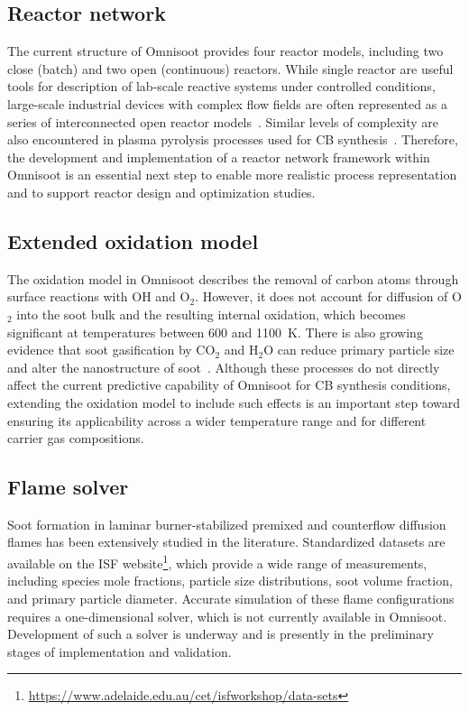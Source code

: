 \subsection{Reactor network}
The current structure of Omnisoot provides four reactor models, including two close (batch) and two open (continuous) reactors. While single reactor are useful tools for description of lab-scale reactive systems under controlled conditions, large-scale industrial devices with complex flow fields are often represented as a series of interconnected open reactor models~\citep{savarese2024model}. Similar levels of complexity are also encountered in plasma pyrolysis processes used for CB synthesis~\citep{lawson2025assessing}. Therefore, the development and implementation of a reactor network framework within Omnisoot is an essential next step to enable more realistic process representation and to support reactor design and optimization studies.

\subsection{Extended oxidation model}

The oxidation model in Omnisoot describes the removal of carbon atoms through surface reactions with OH and O$_2$. However, it does not account for diffusion of O$_2$ into the soot bulk and the resulting internal oxidation, which becomes significant at temperatures between 600 and 1100~K. There is also growing evidence that soot gasification by CO$_2$ and H$_2$O can reduce primary particle size and alter the nanostructure of soot~\citep{chang2020experimental}. Although these processes do not directly affect the current predictive capability of Omnisoot for CB synthesis conditions, extending the oxidation model to include such effects is an important step toward ensuring its applicability across a wider temperature range and for different carrier gas compositions.

\subsection{Flame solver}

Soot formation in laminar burner-stabilized premixed and counterflow diffusion flames has been extensively studied in the literature. Standardized datasets are available on the ISF website\footnote{\href{https://www.adelaide.edu.au/cet/isfworkshop/data-sets}{https://www.adelaide.edu.au/cet/isfworkshop/data-sets}}, which provide a wide range of measurements, including species mole fractions, particle size distributions, soot volume fraction, and primary particle diameter. Accurate simulation of these flame configurations requires a one-dimensional solver, which is not currently available in Omnisoot. Development of such a solver is underway and is presently in the preliminary stages of implementation and validation.

